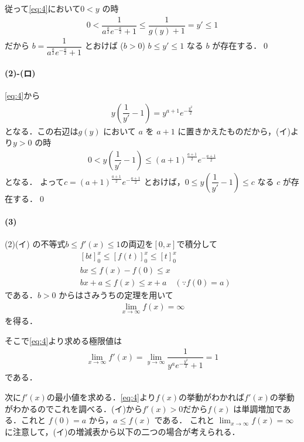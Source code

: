 \documentclass[../../main.tex]{subfiles}
\begin{document}
従って\cref{eq:4}において$0 < y$ の時
\begin{align}
  0 < \dfrac{1}{a^{\frac{a}{2}} e^{-\frac{a}{2}} + 1} \le \dfrac{1}{g(y)+1} = y' \le 1
\end{align}
だから $b = \dfrac{1}{a^{\frac{a}{2}} e^{-\frac{a}{2}} + 1}$ とおけば ($b>0$) $b \le y' \le 1$ なる $b$ が存在する．\qed

\paragraph{(2)-(ロ)}

\cref{eq:4}から
\begin{align}
  y \left(\dfrac{1}{y'} - 1\right) = y^{a+1} e^{-\frac{y^2}{2}} \label{eq:5}
\end{align}
となる．この右辺は$g(y)$ において $a$ を $a+1$ に置きかえたものだから，(イ)より$y>0$ の時
\begin{align}
  0 < y \left(\dfrac{1}{y'} - 1\right) \le (a+1)^{\frac{a+1}{2}} e^{-\frac{a+1}{2}}
\end{align}
となる．
よって$c = (a+1)^{\frac{a+1}{2}} e^{-\frac{a+1}{2}}$ とおけば，$0 \le y \left(\dfrac{1}{y'} - 1\right) \le c$ なる $c$ が存在する．\qed

\paragraph{(3)}

(2)(イ) の不等式$b \le f'(x) \le 1$の両辺を$[0,x]$で積分して
\begin{align}
  & \left[ bt \right]_0^x \le \left[ f(t) \right]_0^x \le \left[ t \right]_0^x \\
  & bx \le f(x) - f(0) \le x \\
  & bx + a \le f(x) \le x + a \quad (\because f(0)=a) \label{eq:6}
\end{align}
である．$b>0$ からはさみうちの定理を用いて
\begin{align}
  \lim_{x \to \infty} f(x) = \infty \label{eq:7}
\end{align}
を得る．

そこで\cref{eq:4}より求める極限値は
\begin{align}
  \lim_{x \to \infty} f'(x) = \lim_{y \to \infty} \dfrac{1}{y^a e^{-\frac{y^2}{2}} + 1} = 1
\end{align}
である．

次に$f'(x)$の最小値を求める．\cref{eq:4}より$f(x)$の挙動がわかれば$f'(x)$の挙動がわかるのでこれを調べる．(イ)から$f'(x)>0$だから$f(x)$ は単調増加である．これと $f(0) = a$ から，$a \le f(x)$ である．
これと $\lim_{x\to\infty} f(x) = \infty$ に注意して，(イ)の増減表から以下の二つの場合が考えられる．
\end{document}
